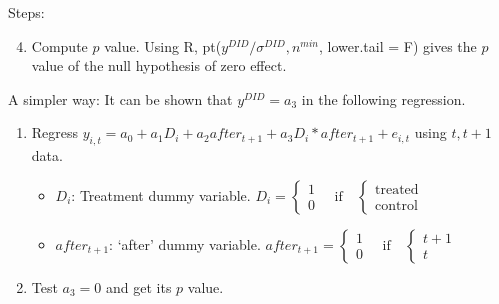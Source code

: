 \begin{frame}[t]{}
Steps:
\begin{enumerate}
\setcounter{enumi}{3}
\vspace{1.0ex}\setlength{\itemsep}{1.0ex}\setlength{\baselineskip}{12pt}
\item	Compute $p$ value. Using R, pt($y^{DID}/\sigma^{DID}, n^{min}$, lower.tail = F) gives the $p$ value of the null hypothesis of zero effect.
\end{enumerate}

\vspace{4ex}
\pause
A simpler way: It can be shown that $y^{DID}=a_{3}$ in the following regression.
\begin{enumerate}
\vspace{1.0ex}\setlength{\itemsep}{1.0ex}\setlength{\baselineskip}{12pt}
\item	Regress $y_{i,t}=a_{0}+a_{1}D_{i}+a_{2}after_{t+1}+a_{3}D_{i}*after_{t+1}+e_{i,t}$ using $t, t+1$ data.
	\begin{itemize}
	\vspace{1.0ex}\setlength{\itemsep}{1.0ex}\setlength{\baselineskip}{12pt}
	\item	$D_{i}$: Treatment dummy variable. $D_{i}
	=\left\{
	\begin{array}{c}
	1\\ 0
	\end{array}
	\right.
	\quad \mbox{if} \quad \left\{
	\begin{array}{l}
	\mbox{treated} \\ \mbox{control}
	\end{array}
	\right.$
	\item	$after_{t+1}$: `after' dummy variable. $after_{t+1}= 
	\left\{
	\begin{array}{c}
	1\\ 0
	\end{array}
	\right.
	\quad \mbox{if} \quad \left\{
	\begin{array}{l}
	t+1 \\ t
	\end{array}
	\right.$
	\end{itemize}
\item	Test $a_{3}=0$ and get its $p$ value.
\end{enumerate}
\end{frame}

